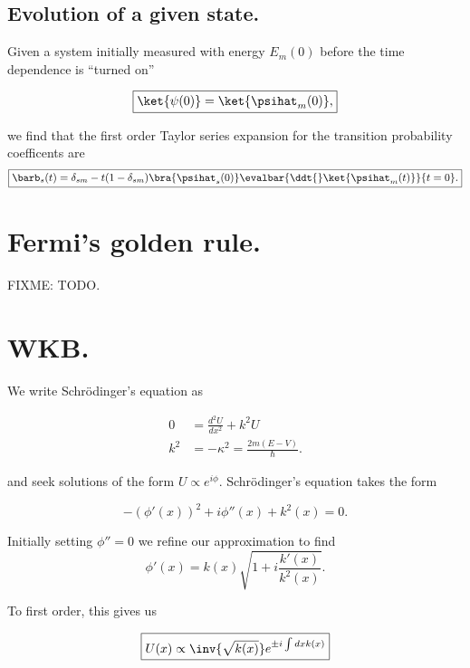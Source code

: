 \subsection{Evolution of a given state.}

Given a system initially measured with energy $E_m(0)$ before the time dependence is ``turned on''

\begin{equation}\label{eqn:qmTwoReview:n}
\boxed{
\ket{\psi(0)} = \ket{\psihat_m(0)},
}
\end{equation}

we find that the first order Taylor series expansion for the transition probability coefficents are
\begin{equation}\label{eqn:adiabaticApprox:290}
\boxed{
\barb_s(t) = \delta_{sm} - t (1 - \delta_{sm}) \bra{\psihat_s(0)} \evalbar{\ddt{} \ket{\psihat_m(t)}}{t=0}.
}
\end{equation}

\section{Fermi's golden rule.}

FIXME: TODO.

\section{WKB.}

We write Schr\"{o}dinger's equation as

\begin{equation}\label{eqn:qmTwoReview:n}
\boxed{
\begin{aligned}
0 &= \frac{d^2 U}{dx^2} + k^2 U \\
k^2 &= -\kappa^2 = \frac{2m (E - V)}{\hbar}.
\end{aligned}
}
\end{equation}

and seek solutions of the form $U \propto e^{i\phi}$.  Schr\"{o}dinger's equation takes the form

\begin{equation}\label{eqn:qmTwoReview:n}
- (\phi'(x))^2 + i \phi''(x) + k^2(x) = 0.
\end{equation}

Initially setting $\phi'' = 0$ we refine our approximation to find
\begin{equation}\label{eqn:qmTwoReview:n}
\phi'(x) 
= k(x) \sqrt{ 1 + i \frac{k'(x)}{k^2(x)} } .
\end{equation}

To first order, this gives us

\begin{equation}\label{eqn:qmTwoReview:n}
\boxed{
U(x) \propto \inv{\sqrt{k(x)}} e^{\pm i \int dx k(x)} 
}
\end{equation}

\EndNoBibArticle
